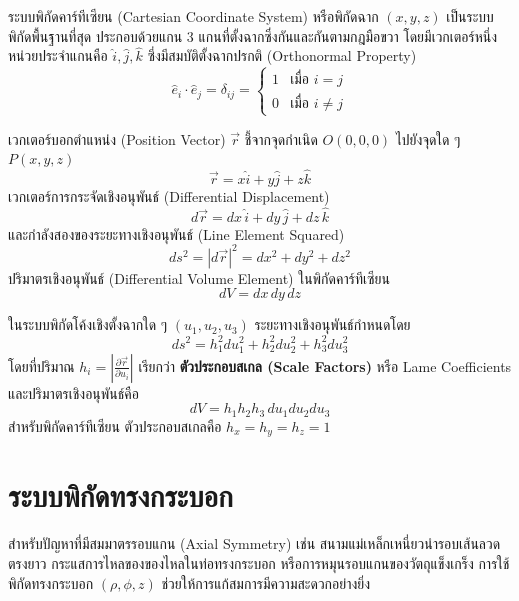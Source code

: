 ระบบพิกัดคาร์ทีเซียน (Cartesian Coordinate System) หรือพิกัดฉาก $(x, y, z)$ เป็นระบบพิกัดพื้นฐานที่สุด ประกอบด้วยแกน 3 แกนที่ตั้งฉากซึ่งกันและกันตามกฎมือขวา โดยมีเวกเตอร์หนึ่งหน่วยประจำแกนคือ $\hat{i}, \hat{j}, \hat{k}$ ซึ่งมีสมบัติตั้งฉากปรกติ (Orthonormal Property)
\begin{equation}
\hat{e}_i \cdot \hat{e}_j = \delta_{ij} = \begin{cases} 1 & \text{เมื่อ } i = j \\ 0 & \text{เมื่อ } i \neq j \end{cases}
\end{equation}

เวกเตอร์บอกตำแหน่ง (Position Vector) $\vec{r}$ ชี้จากจุดกำเนิด $O(0,0,0)$ ไปยังจุดใด ๆ $P(x, y, z)$
\begin{equation}
\vec{r} = x\hat{i} + y\hat{j} + z\hat{k}
\end{equation}
เวกเตอร์การกระจัดเชิงอนุพันธ์ (Differential Displacement)
\begin{equation}
d\vec{r} = dx\,\hat{i} + dy\,\hat{j} + dz\,\hat{k}
\end{equation}
และกำลังสองของระยะทางเชิงอนุพันธ์ (Line Element Squared)
\begin{equation}
ds^2 = |d\vec{r}|^2 = dx^2 + dy^2 + dz^2
\end{equation}
ปริมาตรเชิงอนุพันธ์ (Differential Volume Element) ในพิกัดคาร์ทีเซียน
\begin{equation}
dV = dx\,dy\,dz
\end{equation}

\begin{mathdefinition}
ในระบบพิกัดโค้งเชิงตั้งฉากใด ๆ $(u_1, u_2, u_3)$ ระยะทางเชิงอนุพันธ์กำหนดโดย
\begin{equation}
ds^2 = h_1^2 du_1^2 + h_2^2 du_2^2 + h_3^2 du_3^2
\end{equation}
โดยที่ปริมาณ $h_i = \left|\frac{\partial \vec{r}}{\partial u_i}\right|$ เรียกว่า \textbf{ตัวประกอบสเกล (Scale Factors)} หรือ Lame Coefficients และปริมาตรเชิงอนุพันธ์คือ
\begin{equation}
dV = h_1 h_2 h_3 \, du_1 du_2 du_3
\end{equation}
สำหรับพิกัดคาร์ทีเซียน ตัวประกอบสเกลคือ $h_x = h_y = h_z = 1$
\end{mathdefinition}

\section{ระบบพิกัดทรงกระบอก}
สำหรับปัญหาที่มีสมมาตรรอบแกน (Axial Symmetry) เช่น สนามแม่เหล็กเหนี่ยวนำรอบเส้นลวดตรงยาว กระแสการไหลของของไหลในท่อทรงกระบอก หรือการหมุนรอบแกนของวัตถุแข็งเกร็ง การใช้พิกัดทรงกระบอก $(\rho, \phi, z)$ ช่วยให้การแก้สมการมีความสะดวกอย่างยิ่ง

